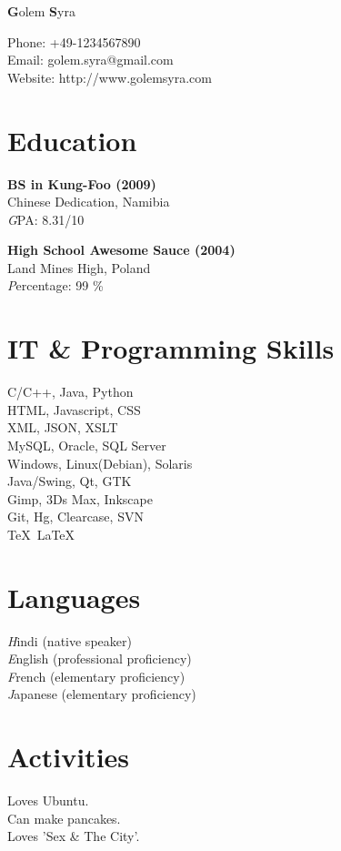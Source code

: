 \documentclass{article}
\begin{document}
\thispagestyle{empty}
\begin{minipage}[c]{0.40\textwidth}
{\bfseries\Huge G}{\Huge olem}
{\bfseries\Huge S}{\Huge yra}

\hfill
\par
Phone: +49-1234567890\\
Email: golem.syra@gmail.com\\
Website: http://www.golemsyra.com

\section*{{\color{green} Education}}
\begin{description}
\item
\par
{\bfseries BS in Kung-Foo (2009)}\\
Chinese Dedication, Namibia\\
{\emph GPA: 8.31/10}

\item
\par
{\bfseries High School Awesome Sauce (2004)}\\
Land Mines High, Poland\\
{\emph Percentage: 99 \%}

\end{description}

\section*{{\color{green} IT \& Programming Skills}}

C/C++, Java, Python\\
HTML, Javascript, CSS\\
XML, JSON, XSLT\\
MySQL, Oracle, SQL Server\\
Windows, Linux(Debian), Solaris\\
Java/Swing, Qt, GTK\\
Gimp, 3Ds Max, Inkscape\\
Git, Hg, Clearcase, SVN\\
\TeX\ \LaTeX\

\section*{{\color{green} Languages}}

{\emph Hindi} (native speaker)\\
{\emph English} (professional proficiency)\\
{\emph French} (elementary proficiency)\\
{\emph Japanese} (elementary proficiency)

\section*{{\color{green} Activities}}

Loves Ubuntu.\\
Can make pancakes.\\
Loves 'Sex \& The City'.\\

\end{minipage}
\end{document}
